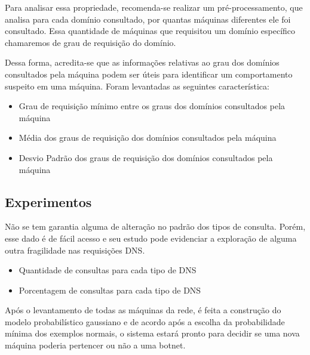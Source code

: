Para analisar essa propriedade, recomenda-se realizar um pré-processamento, que analisa para cada domínio consultado, por quantas máquinas diferentes ele foi consultado. Essa quantidade de máquinas que requisitou um domínio específico chamaremos de grau de requisição do domínio.

Dessa forma, acredita-se que as informações relativas ao grau dos domínios consultados pela máquina podem ser úteis para identificar um comportamento suspeito em uma máquina. Foram levantadas as seguintes característica:

\begin{itemize}
\item Grau de requisição mínimo entre os graus dos domínios consultados pela máquina
\item Média dos graus de requisição dos domínios consultados pela máquina
\item Desvio Padrão dos graus de requisição dos domínios consultados pela máquina

\end{itemize}

\subsection{Experimentos}

Não se tem garantia alguma de alteração no padrão dos tipos de consulta. Porém, esse dado é de fácil acesso e seu estudo pode evidenciar a exploração de alguma outra fragilidade nas requisições DNS.

\begin{itemize}
\item Quantidade de consultas para cada tipo de DNS
\item Porcentagem de consultas para cada tipo de DNS
\end{itemize}

Após o levantamento de todas as máquinas da rede, é feita a construção do modelo probabilístico gaussiano e de acordo após a escolha da probabilidade mínima dos exemplos normais, o sistema estará pronto para decidir se uma nova máquina poderia pertencer ou não a uma botnet.
